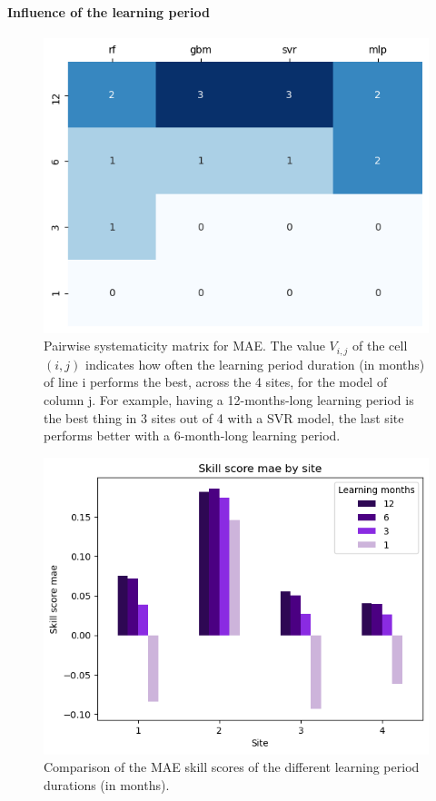 \paragraph{Influence of the learning period}
\begin{figure}[htb!]
    \centering
    \includegraphics[width=\columnwidth]{figures/first_study/comp_learning_period_mae.png}
\caption{Pairwise systematicity matrix for MAE. The value $V_{i,j}$ of the cell $(i,j)$ indicates how often the learning period duration (in months) of line i performs the best, across the 4 sites, for the model of column j. For example, having a 12-months-long learning period is the best thing in 3 sites out of 4 with a SVR model, the last site performs better with a 6-month-long learning period.}
\end{figure}

\begin{figure}[htb!]
    \centering
    \includegraphics[width=\columnwidth]{figures/first_study/comp_learning_period_mae_svr.png}
\caption{Comparison of the MAE skill scores of the different learning period durations (in months).}
\end{figure}

